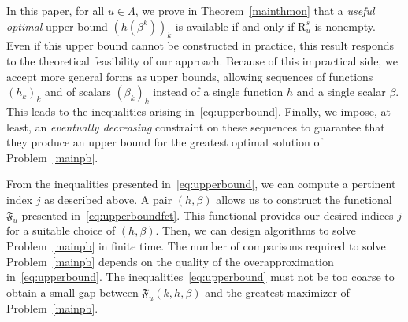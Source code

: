 \documentclass{article}
\def\Fu{\mathfrak{F}_u}
\def\gls#1{{\mathrm R}_{#1}}
\def\gsls#1{\gls{#1}^s}
\begin{document}
In this paper, for all $u\in\Lambda$, we prove in Theorem~\ref{mainthmon} that a {\it useful optimal} upper bound $(h(\beta^k))_k$ is available if and only if $\gsls{u}$ is nonempty. Even if this upper bound cannot be constructed in practice, this result responds to the theoretical feasibility of our approach. Because of this impractical side, we accept more general forms as upper bounds, allowing sequences of functions $(h_k)_k$ and of scalars $(\beta_k)_k$ instead of a single function $h$ and a single scalar $\beta$. This leads to the inequalities arising in~\eqref{eq:upperbound}. Finally, we impose, at least, an {\it eventually decreasing} constraint on these sequences to guarantee that they produce an upper bound for the greatest optimal solution of Problem~\ref{mainpb}. 

From the inequalities presented in~\eqref{eq:upperbound}, we can compute a pertinent index $j$ as described above. A pair $(h,\beta)$ allows us to construct the functional $\Fu$ presented in~\eqref{eq:upperboundfct}. This functional provides our desired indices $j$ for a suitable choice of $(h,\beta)$. Then, we can design algorithms to solve Problem~\ref{mainpb} in finite time. The number of comparisons required to solve Problem~\ref{mainpb} depends on the quality of the overapproximation in~\eqref{eq:upperbound}. The inequalities~\eqref{eq:upperbound} must not be too coarse to obtain a small gap between $\Fu(k,h,\beta)$ and the greatest maximizer of Problem~\ref{mainpb}. 
\end{document}
